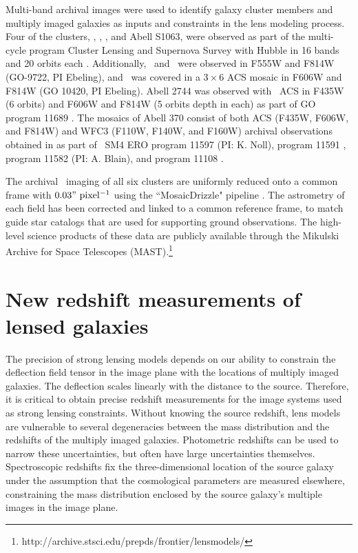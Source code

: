 Multi-band archival images were used to identify galaxy cluster members and multiply imaged galaxies as inputs and constraints in the lens modeling process.  Four of the clusters, \MACSzerofour, \MACSzeroseven, \MACSeleven, and Abell S1063, were observed as part of the multi-cycle program Cluster Lensing and Supernova Survey with Hubble in 16 bands and 20 orbits each \citep[CLASH; PI: M. Postman; see][]{Postman:2012lr}. Additionally, \MACSzeroseven\ and \MACSeleven\ were observed in F555W and F814W (GO-9722, PI Ebeling), and \MACSzeroseven\ was covered in a $3\times6$ ACS mosaic in F606W and F814W (GO 10420, PI Ebeling). Abell 2744 was observed with \hst\ ACS in F435W (6 orbits) and F606W and F814W (5 orbits depth in each) as part of GO program 11689 \citep[PI: R. Dupke; ][]{Merten:2011fk}. The mosaics of Abell 370 consist of both ACS (F435W, F606W, and F814W) and WFC3 (F110W, F140W, and F160W) archival observations obtained in  as part of \hst\ SM4 ERO program 11597 (PI: K. Noll), program 11591 \citep[PI: J.-P. Kneib;][]{Richard:2010wd}, program 11582 (PI: A. Blain), and program 11108 \citep[PI. E. Hu; ][]{Cowie:2011lr}. 

The archival \hst\ imaging of all six clusters are uniformly reduced onto a common frame with $0.03"\ \mathrm{pixel^{-1}}$ using the ``MosaicDrizzle" pipeline \citep[Koekemoer et al 2002, ][for further details]{Koekemoer:2011fk}. The astrometry of each field has been corrected and linked to a common reference frame, to match guide star catalogs that are used for supporting ground observations. The high-level science products of these data are publicly available through the Mikulski Archive for Space Telescopes (MAST).\footnote{http://archive.stsci.edu/prepds/frontier/lensmodels/}

\section{New redshift measurements of lensed galaxies}
\label{chap2:sec:magellan}

The precision of strong lensing models depends on our ability to constrain the deflection field tensor in the image plane with the locations of multiply imaged galaxies. The deflection scales linearly with the distance to the source. Therefore, it is critical to obtain precise redshift measurements for the image systems used as strong lensing constraints. Without knowing the source redshift, lens models are vulnerable to several degeneracies between the mass distribution and the redshifts of the multiply imaged galaxies. Photometric redshifts can be used to narrow these uncertainties, but often have large uncertainties themselves. Spectroscopic redshifts fix the three-dimensional location of the source galaxy under the assumption that the cosmological parameters are measured elsewhere, constraining the mass distribution enclosed by the source galaxy's multiple images in the image plane.

